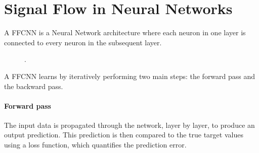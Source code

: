 \section*{Signal Flow in Neural Networks}

A \ac{FFCNN} is a Neural Network architecture where each neuron in one layer is connected to every neuron in the subsequent layer.

\begin{figure}[h]
    \centering
    \caption{.}
    \label{fig:fcnn}
\end{figure}

A \ac{FFCNN} learns by iteratively performing two main steps: the forward pass and the backward pass.

\paragraph{Forward pass} The input data is propagated through the network, layer by layer, to produce an output prediction. This prediction is then compared to the true target values using a loss function, which quantifies the prediction error.

